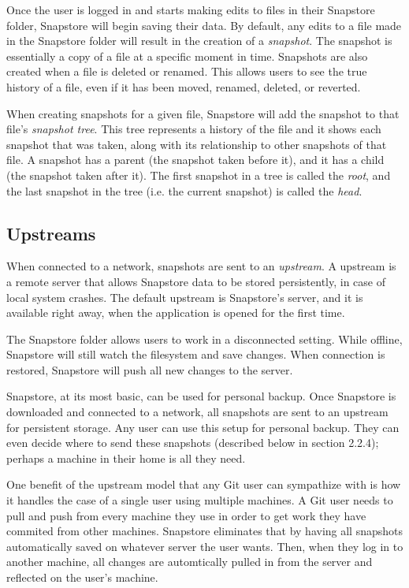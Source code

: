 Once the user is logged in and starts making edits to files in their Snapstore folder, Snapstore will begin saving their data. By default, any edits to a file made in the Snapstore folder will result in the creation of a \textit{snapshot}. The snapshot is essentially a copy of a file at a specific moment in time. Snapshots are also created when a file is deleted or renamed. This allows users to see the true history of a file, even if it has been moved, renamed, deleted, or reverted. 

When creating snapshots for a given file, Snapstore will add the snapshot to that file's \textit{snapshot tree}. This tree represents a history of the file and it shows each snapshot that was taken, along with its relationship to other snapshots of that file. A snapshot has a parent (the snapshot taken before it), and it has a child (the snapshot taken after it). The first snapshot in a tree is called the \textit{root}, and the last snapshot in the tree (i.e. the current snapshot) is called the \textit{head}.

\subsection{Upstreams}

When connected to a network, snapshots are sent to an \textit{upstream}. A upstream is a remote server that allows Snapstore data to be stored persistently, in case of local system crashes. The default upstream is Snapstore's server, and it is available right away, when the application is opened for the first time.

The Snapstore folder allows users to work in a disconnected setting. While offline, Snapstore will still watch the filesystem and save changes. When connection is restored, Snapstore will push all new changes to the server.

Snapstore, at its most basic, can be used for personal backup. Once Snapstore is downloaded and connected to a network, all snapshots are sent to an upstream for persistent storage. Any user can use this setup for personal backup. They can even decide where to send these snapshots (described below in section 2.2.4); perhaps a machine in their home is all they need.

One benefit of the upstream model that any Git user can sympathize with is how it handles the case of a single user using multiple machines. A Git user needs to pull and push from every machine they use in order to get work they have commited from other machines. Snapstore eliminates that by having all snapshots automatically saved on whatever server the user wants. Then, when they log in to another machine, all changes are automtically pulled in from the server and reflected on the user's machine.

